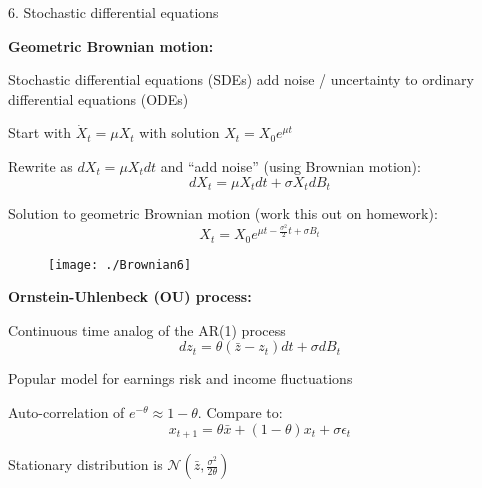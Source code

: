 \documentclass[11pt, aspectratio=169]{beamer}
\newenvironment{witemize}{\itemize\addtolength{\itemsep}{10pt}}{\enditemize}
\begin{document}
\begin{frame}{6. Stochastic differential equations}

\textbf{Geometric Brownian motion:}
\begin{witemize}
\item Stochastic differential equations (SDEs) add noise / uncertainty to ordinary differential equations (ODEs)

\item Start with $\dot X_t = \mu X_t$ with solution $X_t = X_0 e^{\mu t}$

\item Rewrite as $d X_t = \mu X_t dt$ and ``add noise'' (using Brownian motion):
\begin{equation*}
	dX_t = \mu X_t dt + \sigma X_t dB_t
\end{equation*}

\item Solution to geometric Brownian motion (work this out on homework):
\begin{equation*}
	X_t = X_0 e^{\mu t - \frac{\sigma^2}{2} t + \sigma B_t}
\end{equation*}

\end{witemize}
\end{frame}


\begin{frame}{}
	\begin{figure}
		\texttt{[image: ./Brownian6]}
	\end{figure}
\end{frame}


\begin{frame}{}

\textbf{Ornstein-Uhlenbeck (OU) process:}
\begin{witemize}
\item Continuous time analog of the AR(1) process
\begin{equation*}
	dz_t = \theta(\bar z - z_t) dt + \sigma dB_t
\end{equation*}

\item Popular model for earnings risk and income fluctuations

\item Auto-correlation of $e^{-\theta} \approx 1-\theta$. Compare to:
\begin{equation*}
	x_{t+1} = \theta \bar x + (1-\theta) x_t + \sigma \epsilon_t
\end{equation*}

\item Stationary distribution is $\mathcal N(\bar z, \frac{\sigma^2}{2\theta} )$

\end{witemize}
\end{frame}
\end{document}
